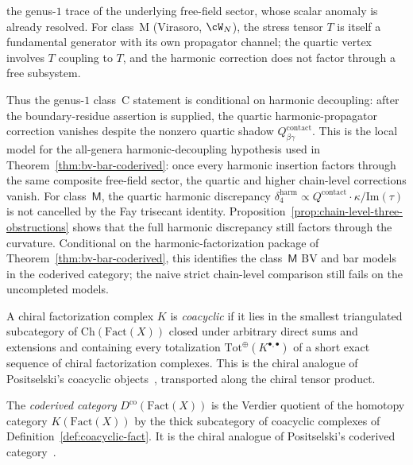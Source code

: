 \begin{remark}
\begin{enumerate}[label=\textup{(\roman*)},nosep]
 the genus-$1$ trace of the underlying free-field sector, whose scalar
 anomaly is already resolved.
 For class~M (Virasoro, $\cW_N$), the stress tensor $T$ is
 itself a fundamental generator with its own propagator channel;
 the quartic vertex involves $T$ coupling to $T$, and the
 harmonic correction does not factor through a free subsystem.
\end{enumerate}
Thus the genus-$1$ class~C statement is conditional on harmonic
decoupling: after the boundary-residue assertion is supplied, the
quartic harmonic-propagator correction vanishes despite the nonzero
quartic shadow $Q^{\mathrm{contact}}_{\beta\gamma}$. This is the
local model for the all-genera harmonic-decoupling hypothesis used in
Theorem~\ref{thm:bv-bar-coderived}: once every harmonic insertion
factors through the same composite free-field sector, the quartic
and higher chain-level corrections vanish. For class~$\mathsf{M}$, the
quartic harmonic discrepancy
$\delta_4^{\mathrm{harm}} \propto Q^{\mathrm{contact}} \cdot
\kappa / \mathrm{Im}(\tau)$ is not cancelled by the Fay trisecant
identity. Proposition~\ref{prop:chain-level-three-obstructions}
shows that the full harmonic discrepancy still factors through the
curvature. Conditional on the harmonic-factorization package of
Theorem~\ref{thm:bv-bar-coderived}, this identifies the
class~$\mathsf{M}$ BV and bar models in the coderived category; the
naive strict chain-level comparison still fails on the uncompleted
models.
\end{remark}

\begin{definition}%
\label{def:coacyclic-fact}%
%
A chiral factorization complex $K$ is \emph{coacyclic} if it lies
in the smallest triangulated subcategory of
$\mathrm{Ch}(\mathrm{Fact}(X))$ closed under arbitrary direct sums
and extensions and containing every totalization
$\mathrm{Tot}^{\oplus}(K^{\bullet,\bullet})$ of a short exact
sequence of chiral factorization complexes. This is the chiral
analogue of Positselski's coacyclic objects~\cite{Positselski11},
transported along the chiral tensor product.
\end{definition}

\begin{definition}%
\label{def:coderived-fact}%
%
The \emph{coderived category}
$D^{\mathrm{co}}(\mathrm{Fact}(X))$ is the Verdier quotient of the
homotopy category $K(\mathrm{Fact}(X))$ by the thick subcategory of
coacyclic complexes of
Definition~\ref{def:coacyclic-fact}. It is the chiral
analogue of Positselski's coderived
category~\cite{Positselski11}.
\end{definition}

